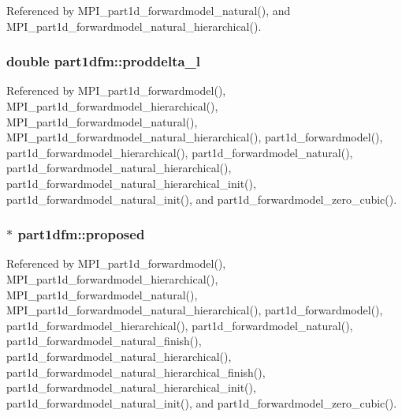 Referenced by M\+P\+I\+\_\+part1d\+\_\+forwardmodel\+\_\+natural(), and M\+P\+I\+\_\+part1d\+\_\+forwardmodel\+\_\+natural\+\_\+hierarchical().

\subsubsection[{\texorpdfstring{proddelta\+\_\+l}{proddelta_l}}]{\setlength{\rightskip}{0pt plus 5cm}double part1dfm\+::proddelta\+\_\+l}\hypertarget{structpart1dfm_a4d304ab3156bf80a702193ce6dd87361}{}\label{structpart1dfm_a4d304ab3156bf80a702193ce6dd87361}


Referenced by M\+P\+I\+\_\+part1d\+\_\+forwardmodel(), M\+P\+I\+\_\+part1d\+\_\+forwardmodel\+\_\+hierarchical(), M\+P\+I\+\_\+part1d\+\_\+forwardmodel\+\_\+natural(), M\+P\+I\+\_\+part1d\+\_\+forwardmodel\+\_\+natural\+\_\+hierarchical(), part1d\+\_\+forwardmodel(), part1d\+\_\+forwardmodel\+\_\+hierarchical(), part1d\+\_\+forwardmodel\+\_\+natural(), part1d\+\_\+forwardmodel\+\_\+natural\+\_\+hierarchical(), part1d\+\_\+forwardmodel\+\_\+natural\+\_\+hierarchical\+\_\+init(), part1d\+\_\+forwardmodel\+\_\+natural\+\_\+init(), and part1d\+\_\+forwardmodel\+\_\+zero\+\_\+cubic().

\subsubsection[{\texorpdfstring{proposed}{proposed}}]{ $\ast$ part1dfm\+::proposed}\hypertarget{structpart1dfm_acbe95d1f9621f2ee6466e54205486e79}{}\label{structpart1dfm_acbe95d1f9621f2ee6466e54205486e79}


Referenced by M\+P\+I\+\_\+part1d\+\_\+forwardmodel(), M\+P\+I\+\_\+part1d\+\_\+forwardmodel\+\_\+hierarchical(), M\+P\+I\+\_\+part1d\+\_\+forwardmodel\+\_\+natural(), M\+P\+I\+\_\+part1d\+\_\+forwardmodel\+\_\+natural\+\_\+hierarchical(), part1d\+\_\+forwardmodel(), part1d\+\_\+forwardmodel\+\_\+hierarchical(), part1d\+\_\+forwardmodel\+\_\+natural(), part1d\+\_\+forwardmodel\+\_\+natural\+\_\+finish(), part1d\+\_\+forwardmodel\+\_\+natural\+\_\+hierarchical(), part1d\+\_\+forwardmodel\+\_\+natural\+\_\+hierarchical\+\_\+finish(), part1d\+\_\+forwardmodel\+\_\+natural\+\_\+hierarchical\+\_\+init(), part1d\+\_\+forwardmodel\+\_\+natural\+\_\+init(), and part1d\+\_\+forwardmodel\+\_\+zero\+\_\+cubic().

